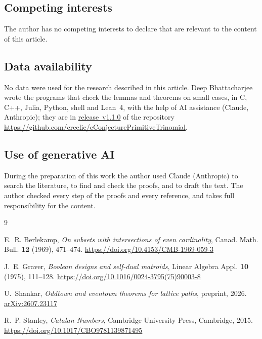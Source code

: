 \documentclass[11pt]{amsart}
\theoremstyle{definition}
\theoremstyle{remark}
\numberwithin{equation}{section}
\providecommand{\doi}[1]{\url{https://doi.org/#1}}
\begin{document}
\subsection*{Competing interests} The author has no competing interests to declare that are relevant to the content of this article.

\subsection*{Data availability} No data were used for the research described in this article. Deep Bhattacharjee wrote the programs that check the lemmas and theorems on small cases, in C, C++, Julia, Python, shell and Lean~4, with the help of AI assistance (Claude, Anthropic); they are in \href{https://github.com/creelie/eConjecturePrimitiveTrinomial/releases/tag/v1.1.0}{release~v1.1.0} of the repository \url{https://github.com/creelie/eConjecturePrimitiveTrinomial}.

\subsection*{Use of generative AI} During the preparation of this work the author used Claude (Anthropic) to search the literature, to find and check the proofs, and to draft the text. The author checked every step of the proofs and every reference, and takes full responsibility for the content.

\begin{thebibliography}{9}

E.~R. Berlekamp, \emph{On subsets with intersections of even cardinality}, Canad. Math. Bull. \textbf{12} (1969), 471--474. \doi{10.4153/CMB-1969-059-3}

J.~E. Graver, \emph{Boolean designs and self-dual matroids}, Linear Algebra Appl. \textbf{10} (1975), 111--128. \doi{10.1016/0024-3795(75)90003-8}

U.~Shankar, \emph{Oddtown and eventown theorems for lattice paths}, preprint, 2026. \href{https://arxiv.org/abs/2607.23117}{arXiv:2607.23117}

R.~P. Stanley, \emph{Catalan Numbers}, Cambridge University Press, Cambridge, 2015. \doi{10.1017/CBO9781139871495}

\end{thebibliography}
\end{document}
